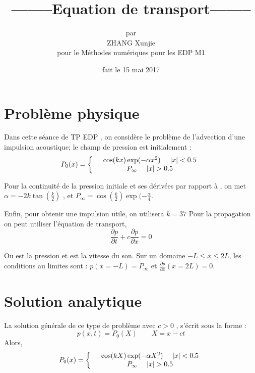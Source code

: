 \documentclass[a4paper,10pt]{report} %
\title{--------\textbf{Equation de transport}--------} %
\author{par\\ZHANG Xunjie\\pour le Méthodes numériques pour les EDP M1 } %
\date{fait le 15 mai 2017} %
\begin{document}
\maketitle %
\tableofcontents %
\listoffigures %






\chapter{Problème physique} %


Dans cette séance de TP EDP , on considère le problème de l'advection d'une impulsion acoustique; le champ de pression est initialement :
\begin{equation}
    P_0(x)=\left\{
    \begin{array}{r c l}
       &\cos(kx)\exp(-\alpha x^2)\,\,\,\,\,\,\,\,|x|<0.5\\&P_{\infty}\,\,\,\,\,\,\,\,|x|>0.5
    \end{array}
    \right.
\end{equation}


Pour la continuité de la pression initiale et ses dérivées par rapport  à , on met $\alpha=-2k\tan(\frac{k}{2})$ , et $P_{\infty}=\cos(\frac{k}{2})\exp(-\frac{\alpha}{4}$. 

Enfin, pour obtenir une impulsion utile, on utilisera $ k=37$
Pour la propagation on peut utiliser l’équation de transport,
\begin{equation}
\frac{\partial p}{\partial t}+c\frac{\partial p}{\partial x}=0
\end{equation}

Ou  est la pression et est la vitesse du son.
Sur un domaine $-L\leq x\leq 2L$, les conditions au limites sont : 
$p(x=-L)=P_{\infty}$  et  $\frac{\partial p}{\partial x}(x=2L)=0$.

\chapter{Solution analytique}
La solution générale de ce type de problème avec $c>0$ , s’écrit sous la forme : 
\begin{equation}
p(x,t)=P_0(X) \,\,\,\,\,\,\,\,\,\,\,\,X=x-ct
\end{equation}                       
Alors, 
\begin{equation}
    P_0(x)=\left\{
    \begin{array}{r c l}
       &\cos(kX)\exp(-\alpha X^2)\,\,\,\,\,\,\,\,|x|<0.5\\&P_{\infty}\,\,\,\,\,\,\,\,|x|>0.5
    \end{array}
    \right.
\end{equation}
\end{document}
